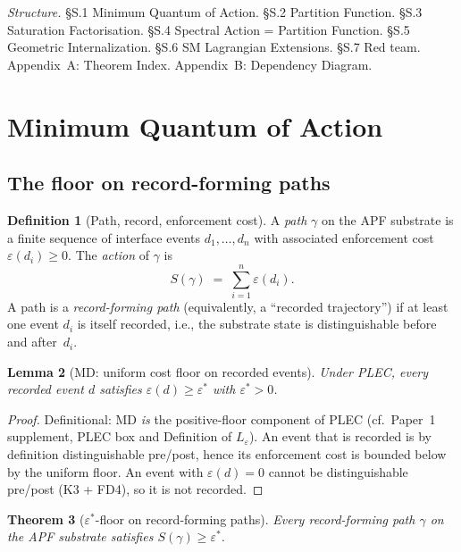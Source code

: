 \documentclass[11pt,a4paper]{article}
\newtheorem{theorem}{Theorem}[section]
\newtheorem{lemma}[theorem]{Lemma}
\theoremstyle{definition}
\newtheorem{definition}[theorem]{Definition}
\newcommand{\eps}{\varepsilon}
\newcommand{\epsstar}{\varepsilon^{\ast}}
\begin{document}
\medskip

\textit{Structure.}  §S.1 Minimum Quantum of Action.  §S.2 Partition Function.  §S.3 Saturation Factorisation.  §S.4 Spectral Action = Partition Function.  §S.5 Geometric Internalization.  §S.6 SM Lagrangian Extensions.  §S.7 Red team.  Appendix~A: Theorem Index.  Appendix~B: Dependency Diagram.

\clearpage
\tableofcontents
\clearpage

\section{Minimum Quantum of Action}\label{sec:Smin}
\setcounter{theorem}{0}

\subsection{The floor on record-forming paths}

\begin{definition}[Path, record, enforcement cost]
\label{def:path}
A \emph{path} $\gamma$ on the APF substrate is a finite sequence of interface events $d_1,\dots,d_n$ with associated enforcement cost $\eps(d_i)\geq 0$.  The \emph{action} of $\gamma$ is
\[
   S(\gamma) \;=\; \sum_{i=1}^{n} \eps(d_i).
\]
A path is a \emph{record-forming path} (equivalently, a ``recorded trajectory'') if at least one event $d_i$ is itself recorded, i.e., the substrate state is distinguishable before and after~$d_i$.
\end{definition}

\begin{lemma}[MD: uniform cost floor on recorded events]
\label{lem:MDfloor}
Under PLEC, every recorded event $d$ satisfies $\eps(d)\geq\epsstar$ with $\epsstar>0$.
\end{lemma}

\begin{proof}
Definitional: MD \emph{is} the positive-floor component of PLEC (cf.\ Paper~1 supplement, PLEC box and Definition of $L_\eps$).  An event that is recorded is by definition distinguishable pre/post, hence its enforcement cost is bounded below by the uniform floor.  An event with $\eps(d)=0$ cannot be distinguishable pre/post (K3 + FD4), so it is not recorded.
\end{proof}

\begin{theorem}[$\epsstar$-floor on record-forming paths]
\label{thm:Seps}
Every record-forming path $\gamma$ on the APF substrate satisfies $S(\gamma)\geq\epsstar$.
\end{theorem}
\end{document}
